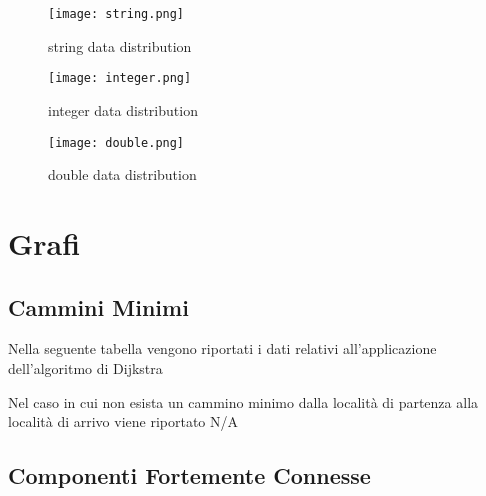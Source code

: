 \documentclass{report}
\begin{document}
\begin{figure}[h!]
\centering
\texttt{[image: string.png]}
\caption{string data distribution}
\label{fig:string}
\end{figure}

\begin{figure}[h!]
\centering
\texttt{[image: integer.png]}
\caption{integer data distribution}
\label{fig:string}
\end{figure}

\begin{figure}[h!]
\centering
\texttt{[image: double.png]}
\caption{double data distribution}
\label{fig:string}
\end{figure}

\chapter{Grafi}

\section{Cammini Minimi}

Nella seguente tabella vengono riportati i dati relativi all'applicazione dell'algoritmo di Dijkstra

\begin{table} [!htb]
\centering
{}
\end{table}

Nel caso in cui non esista un cammino minimo dalla località di partenza alla località di arrivo viene riportato N/A

\section{Componenti Fortemente Connesse}
\end{document}
